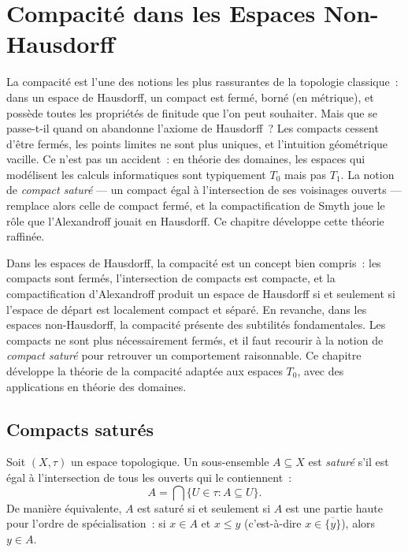 \chapter{Compacit\'e dans les Espaces Non-Hausdorff}
\label{ch:compacite}

La compacit\'e est l'une des notions les plus rassurantes de la topologie classique~: dans un espace de Hausdorff, un compact est ferm\'e, born\'e (en m\'etrique), et poss\`ede toutes les propri\'et\'es de finitude que l'on peut souhaiter. Mais que se passe-t-il quand on abandonne l'axiome de Hausdorff~? Les compacts cessent d'\^etre ferm\'es, les points limites ne sont plus uniques, et l'intuition g\'eom\'etrique vacille. Ce n'est pas un accident~: en th\'eorie des domaines, les espaces qui mod\'elisent les calculs informatiques sont typiquement $T_0$ mais pas $T_1$. La notion de \emph{compact satur\'e} --- un compact \'egal \`a l'intersection de ses voisinages ouverts --- remplace alors celle de compact ferm\'e, et la compactification de Smyth joue le r\^ole que l'Alexandroff jouait en Hausdorff. Ce chapitre d\'eveloppe cette th\'eorie raffin\'ee.

\begin{intuition}
Dans les espaces de Hausdorff, la compacit\'e est un concept bien compris~: les compacts
sont ferm\'es, l'intersection de compacts est compacte, et la compactification d'Alexandroff
produit un espace de Hausdorff si et seulement si l'espace de d\'epart est localement compact
et s\'epar\'e. En revanche, dans les espaces non-Hausdorff, la compacit\'e pr\'esente des
subtilit\'es fondamentales. Les compacts ne sont plus n\'ecessairement ferm\'es, et il faut
recourir \`a la notion de \emph{compact satur\'e} pour retrouver un comportement raisonnable.
Ce chapitre d\'eveloppe la th\'eorie de la compacit\'e adapt\'ee aux espaces $T_0$, avec
des applications en th\'eorie des domaines.
\end{intuition}

\section{Compacts satur\'es}

\begin{definition}
Soit $(X,\tau)$ un espace topologique. Un sous-ensemble $A \subseteq X$ est \emph{satur\'e}
s'il est \'egal \`a l'intersection de tous les ouverts qui le contiennent~:
\[
  A = \bigcap \{ U \in \tau : A \subseteq U \}.
\]
De mani\`ere \'equivalente, $A$ est satur\'e si et seulement si $A$ est une partie haute pour
l'ordre de sp\'ecialisation~: si $x \in A$ et $x \leq y$ (c'est-\`a-dire $x \in \overline{\{y\}}$),
alors $y \in A$.
\end{definition}

